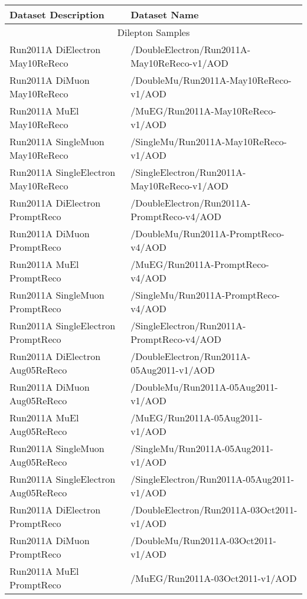 \begin{table}[!ht]
\begin{center}
\begin{tabular}{|l|l|}
\hline
 Dataset Description                   &   Dataset Name   \\
\hline
\hline
\multicolumn{2}{|c|}{Dilepton Samples} \\
\hline
Run2011A DiElectron May10ReReco      &  /DoubleElectron/Run2011A-May10ReReco-v1/AOD \\
Run2011A DiMuon May10ReReco          &  /DoubleMu/Run2011A-May10ReReco-v1/AOD \\
Run2011A MuEl May10ReReco            &  /MuEG/Run2011A-May10ReReco-v1/AOD \\
Run2011A SingleMuon May10ReReco      &  /SingleMu/Run2011A-May10ReReco-v1/AOD \\
Run2011A SingleElectron May10ReReco  &  /SingleElectron/Run2011A-May10ReReco-v1/AOD   \\
\hline
Run2011A DiElectron PromptReco      &  /DoubleElectron/Run2011A-PromptReco-v4/AOD   \\
Run2011A DiMuon PromptReco          &  /DoubleMu/Run2011A-PromptReco-v4/AOD   \\
Run2011A MuEl PromptReco            &  /MuEG/Run2011A-PromptReco-v4/AOD   \\
Run2011A SingleMuon PromptReco      &  /SingleMu/Run2011A-PromptReco-v4/AOD   \\
Run2011A SingleElectron PromptReco  &  /SingleElectron/Run2011A-PromptReco-v4/AOD   \\
\hline
Run2011A DiElectron Aug05ReReco      &  /DoubleElectron/Run2011A-05Aug2011-v1/AOD \\
Run2011A DiMuon Aug05ReReco          &  /DoubleMu/Run2011A-05Aug2011-v1/AOD \\
Run2011A MuEl Aug05ReReco            &  /MuEG/Run2011A-05Aug2011-v1/AOD \\
Run2011A SingleMuon Aug05ReReco      &  /SingleMu/Run2011A-05Aug2011-v1/AOD \\
Run2011A SingleElectron Aug05ReReco  &  /SingleElectron/Run2011A-05Aug2011-v1/AOD   \\
\hline
Run2011A DiElectron PromptReco      &  /DoubleElectron/Run2011A-03Oct2011-v1/AOD   \\
Run2011A DiMuon PromptReco          &  /DoubleMu/Run2011A-03Oct2011-v1/AOD   \\
Run2011A MuEl PromptReco            &  /MuEG/Run2011A-03Oct2011-v1/AOD   \\

\end{tabular}
\end{center}
\end{table}
